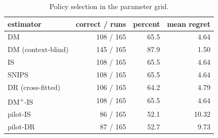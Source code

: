 \begin{table}[!htbp]
\centering
\caption{Policy selection in the parameter grid.}
\label{tab:selection}
\footnotesize
\begin{tabular}{lrrr}
\toprule
estimator & correct / runs & percent & mean regret \\
\midrule
DM & 108 / 165 & 65.5 & 4.64 \\
DM (context-blind) & 145 / 165 & 87.9 & 1.50 \\
IS & 108 / 165 & 65.5 & 4.64 \\
SNIPS & 108 / 165 & 65.5 & 4.64 \\
DR (cross-fitted) & 106 / 165 & 64.2 & 4.79 \\
DM\textsuperscript{+}-IS & 108 / 165 & 65.5 & 4.64 \\
pilot-IS & 86 / 165 & 52.1 & 10.32 \\
pilot-DR & 87 / 165 & 52.7 & 9.73 \\
\bottomrule
\end{tabular}
\end{table}
